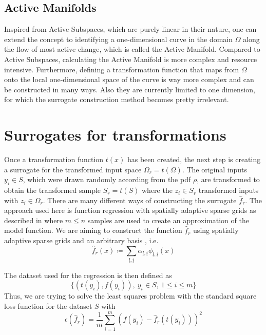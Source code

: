 \documentclass[
  a4paper,  %
  twoside,  %
  bibliography=totoc,
  headsepline,
  cleardoublepage=empty,
  parskip=half,
  draft=false
]{scrbook}
\begin{document}

\section{Active Manifolds}

Inspired from Active Subspaces, which are purely linear in their nature, one can extend the concept to identifying a one-dimensional curve in the domain $\Omega$ along the flow of most active change, which is called the Active Manifold.
Compared to Active Subspaces, calculating the Active Manifold is more complex and resource intensive.
Furthermore, defining a transformation function that maps from $\Omega$ onto the local one-dimensional space of the curve is way more complex and can be constructed in many ways.
Also they are currently limited to one dimension, for which the surrogate construction method becomes pretty irrelevant.


\chapter{Surrogates for transformations}

Once a transformation function $t(x)$ has been created, the next step is creating a surrogate for the transformed input space $\Omega_r=t(\Omega)$.
The original inputs $y_i \in S$, which were drawn randomly according from the pdf $\rho$, are transformed to obtain the transformed sample $S_r=t(S)$ where the $z_i \in S_r$ transformed inputs with $z_i \in \Omega_r$.
There are many different ways of constructing the surrogate $\hat{f}_r$.
The approach used here is function regression with spatially adaptive sparse grids as described in \cite{P10} where $m \leq n$ samples are used to create an approximation of the model function.
We are aiming to construct the function $\hat{f}_r$ using spatially adaptive sparse grids and an arbitrary basis , i.e.
\begin{equation}
\hat{f}_r(x) \coloneqq \sum_{\underline{l},\underline{i}} \alpha_{\underline{l},\underline{i}} \phi_{\underline{l},\underline{i}}(x)
\end{equation}

The dataset used for the regression is then defined as
\begin{equation}
\{(t(y_i),f(y_i)), ~ y_i \in S, ~ 1 \leq i \leq m\}
\end{equation}
Thus, we are trying to solve the least squares problem with the standard square loss function for the dataset $S$ with
\begin{equation}
\epsilon(\hat{f}_r)=\frac{1}{m} \sum_{i=1}^m (f(y_i) - \hat{f}_r(t(y_i)))^2 
\end{equation}
\end{document}

